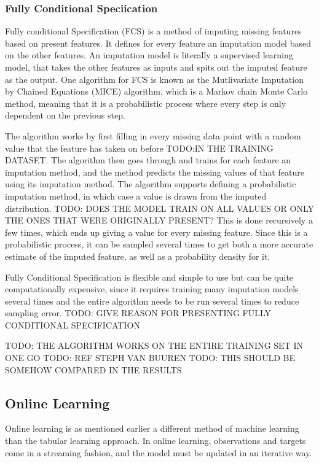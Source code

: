 \subsubsection{Fully Conditional Speciication}

Fully conditional Specification (FCS) is a method of imputing missing features
based on present features. It defines for every feature an imputation model
based on the other features. An imputation model is literally a supervised
learning model, that takes the other features as inputs and spits out the
imputed feature as the output. One algorithm for FCS is known as the
Mutlivariate Imputation by Chained Equations (MICE) algorithm, which is a
Markov chain Monte Carlo method, meaning that it is a probabilistic process
where every step is only dependent on the previous step.

The algorithm works by first filling in every missing data point with a random
value that the feature has taken on before TODO:IN THE TRAINING DATASET. The
algorithm then goes through and trains for each feature an imputation method,
and the method predicts the missing values of that feature using its imputation
method. The algorithm supports defining a probabilistic imputation method, in
which case a value is drawn from the imputed distribution.  TODO: DOES THE
MODEL TRAIN ON ALL VALUES OR ONLY THE ONES THAT WERE ORIGINALLY PRESENT? This
is done recursively a few times, which ends up giving a value for every missing
feature. Since this is a probabilistic process, it can be sampled several times
to get both a more accurate estimate of the imputed feature, as well as a
probability density for it.

Fully Conditional Specification is flexible and simple to use but can be quite
computationally expensive, since it requires training many imputation models
several times and the entire algorithm needs to be run several times to reduce
sampling error. TODO: GIVE REASON FOR PRESENTING FULLY CONDITIONAL
SPECIFICATION

TODO: THE ALGORITHM WORKS ON THE ENTIRE TRAINING SET IN ONE GO
TODO: REF STEPH VAN BUUREN
TODO: THIS SHOULD BE SOMEHOW COMPARED IN THE RESULTS

\subsection{Online Learning}

Online learning is as mentioned earlier a different method of machine learning
than the tabular learning approach. In online learning, observations and
targets come in a streaming fashion, and the model must be updated in an
iterative way.


